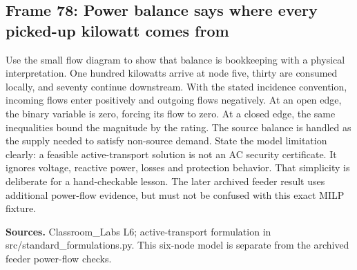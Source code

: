 \documentclass[11pt]{article}
\begin{document}
\subsection*{Frame 78: Power balance says where every picked-up kilowatt comes from}
Use the small flow diagram to show that balance is bookkeeping with a physical interpretation. One hundred kilowatts arrive at node five, thirty are consumed locally, and seventy continue downstream. With the stated incidence convention, incoming flows enter positively and outgoing flows negatively. At an open edge, the binary variable is zero, forcing its flow to zero. At a closed edge, the same inequalities bound the magnitude by the rating. The source balance is handled as the supply needed to satisfy non-source demand. State the model limitation clearly: a feasible active-transport solution is not an AC security certificate. It ignores voltage, reactive power, losses and protection behavior. That simplicity is deliberate for a hand-checkable lesson. The later archived feeder result uses additional power-flow evidence, but must not be confused with this exact MILP fixture.\par
\par\nopagebreak\begin{minipage}{\linewidth}{\footnotesize\color{slate}\textbf{Sources.} Classroom\_Labs L6; active-transport formulation in src/standard\_formulations.py. This six-node model is separate from the archived feeder power-flow checks.\par}\end{minipage}\par\medskip
\end{document}

